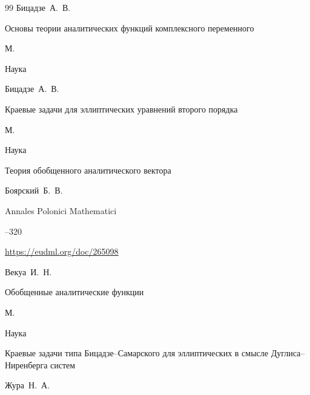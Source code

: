 \begin{thebibliography}{99}
\by Бицадзе~А.~В.

\book Основы теории аналитических функций комплексного переменного

\publaddr М.

\publ Наука







\by Бицадзе~А.~В.

\book Краевые задачи для эллиптических уравнений второго порядка

\publaddr М.

\publ Наука









\paper Теория обобщенного аналитического вектора

\by Боярский~Б.~В.

\jour Annales Polonici Mathematici




--320

\elink \url{https://eudml.org/doc/265098}






\by Векуа~И.~Н.

\book Обобщенные аналитические функции

\publaddr М.

\publ Наука









\paper Краевые задачи типа Бицадзе--Самарского для эллиптических    в смысле Дуглиса--Ниренберга систем

\by  Жура~Н.~А.


\end{thebibliography}
